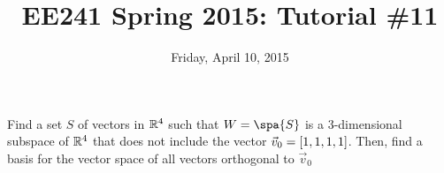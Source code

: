 \documentclass{tutorial}
\begin{document}
\newif\ifsolns


\title{EE241 Spring 2015: Tutorial \#11}
\date{Friday, April 10, 2015}
\maketitle

\begin{prob}
Find a set $S$ of vectors in $\mathbb{R}^4$ such that $W = \spa{S}$ is a $3$-dimensional subspace of $\mathbb{R}^4$ that does not include the vector $\vec{v}_0 = \left[ 1,1,1,1 \right]$. Then, find a basis for the vector space of all vectors orthogonal to $\vec{v}_0$
\end{prob} \ifsolns \begin{proof}
For the first part, we can simply choose
\begin{align*}
  S
  & = \lb \vec{u}_1, \vec{u}_2, \vec{u}_3 \rb \\
  & = \lb \ls 1,0,0,0 \rs \; , \; \ls 0,1,0,0 \rs \; , \; \ls 0,0,1,0 \rs \rb .
\end{align*}
Note that $W \subset \mbR^4$ but $\vec{v}_0 \nin W$, which can be seen by just checking the last component. However, $W$ clearly contains vectors that are non orthogonal to $\vec{v}_0$. For example, none of the $\vec{u}_i$ even have inner-product $0$ with it. One way to make the new set $S'$ such that $W' \perp \spa{\vec{v}_0}$ is to simply subtract from each $\vec{u}_i$ the projection of $\vec{v}_0$, i.e.:
\[
  \vec{u}_i' = \vec{u}_i - \frac{\vec{u}_i \cdot \vec{v}_0}{| \vec{u}_i || \vec{v}_0 |} \frac{\vec{v}_0}{|\vec{v}_0|}
\]
Or
\begin{align*}
  \vec{u}_1'
  & = \ls 1,0,0,0 \rs - \frac{1}{4} \ls 1,1,1,1 \rs \\
  & = \ls \frac{3}{4}, -\frac{1}{4}, -\frac{1}{4}, -\frac{1}{4} \rs \\
  \vec{u}_2'
  & = \ls -\frac{1}{4}, \frac{3}{4}, -\frac{1}{4}, -\frac{1}{4} \rs \\
  \vec{u}_3'
  & = \ls -\frac{1}{4}, -\frac{1}{4}, \frac{3}{4}, -\frac{1}{4} \rs \\
\end{align*}
Finally, to show that for any $\vec{w} \in W'$ we have that $\vec{w} \cdot \vec{v}_0 = 0$, we can simply write $\vec{w}$ as a linear combination of the new basis $S'$,
\begin{align*}
  \vec{w} \cdot \vec{v}_0
  & = \lp w_1 \vec{u}_1' + w_2 \vec{u}_2' + w_3 \vec{u}_3' \rp \cdot \vec{v}_0 \\
  & = w_1 \vec{u}_1'\cdot \vec{v}_0 + w_2 \vec{u}_2'\cdot \vec{v}_0 + w_3 \vec{u}_3' \cdot \vec{v}_0 \\
  & = 0+0+0 \\
  & = 0 .
\end{align*}
\end{proof}\else \vspace{3in} \fi
\end{document}
